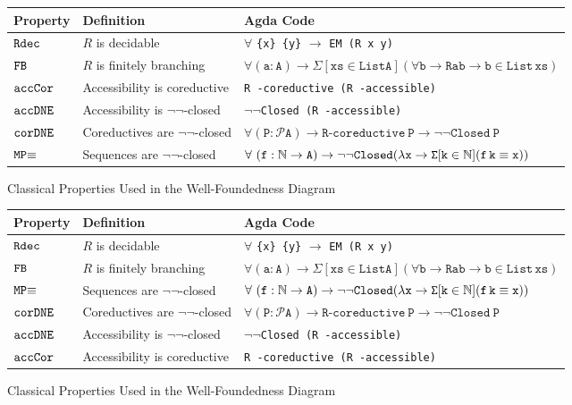 {
\def\arraystretch{1.3}
\begin{figure}[h!]
\small 
\begin{tabular}{@{}l l l @{}}
\toprule
\textbf{Property} & \textbf{Definition}  &\textbf{Agda Code}  \\
\midrule
$\mathtt{Rdec}$   & $R$ is decidable 
          & $\forall$ \verb|{x} {y}| $\to$ \verb|EM (R x y)|\\
$\mathtt{FB}$     & $R$ is finitely branching 
          & $\mathtt{\forall (a : A) \to \Sigma [ xs \in List A ] (\forall b \to R a b \to b \in{}List\, xs)}$ \\
$\mathtt{accCor}$ & Accessibility is coreductive 
          & \verb|R -coreductive (R -accessible)| \\
$\mathtt{accDNE}$ & Accessibility is $\lnot\lnot$-closed
          & $\lnot\lnot$\verb|Closed (R -accessible)| \\
$\mathtt{corDNE}$ & Coreductives are $\lnot\lnot$-closed 
          & $\mathtt{\forall (P : \mathcal{P} A) \to R}$-$\mathtt{coreductive\ P \to \lnot\lnot Closed\ P}$\\ 
$\mathtt{MP}{\equiv}$    & Sequences are $\lnot\lnot$-closed
          & $\forall\ \mathtt{(f : \nat \to A) \to \lnot\lnot Closed 
          (\lambda x \to \Sigma [ k \in \nat ] (f\, k \equiv x))}$ \\
\bottomrule
\end{tabular}
\centering
\caption{Classical Properties Used in the Well-Foundedness Diagram}
\label{tab:cprop}
\end{figure}
}

{
\def\arraystretch{1.3}
\begin{figure}[h!]
\small 
\begin{tabular}{@{}l l l @{}}
\toprule
\textbf{Property} & \textbf{Definition}  &\textbf{Agda Code}  \\
\midrule
$\mathtt{Rdec}$   & $R$ is decidable 
          & $\forall$ \verb|{x} {y}| $\to$ \verb|EM (R x y)|\\
$\mathtt{FB}$     & $R$ is finitely branching 
          & $\mathtt{\forall (a : A) \to \Sigma [ xs \in List A ] (\forall b \to R a b \to b \in{}List\, xs)}$ \\
$\mathtt{MP}{\equiv}$    & Sequences are $\lnot\lnot$-closed
          & $\forall\ \mathtt{(f : \nat \to A) \to \lnot\lnot Closed 
          (\lambda x \to \Sigma [ k \in \nat ] (f\, k \equiv x))}$ \\
$\mathtt{corDNE}$ & Coreductives are $\lnot\lnot$-closed 
          & $\mathtt{\forall (P : \mathcal{P} A) \to R}$-$\mathtt{coreductive\ P \to \lnot\lnot Closed\ P}$\\ 
$\mathtt{accDNE}$ & Accessibility is $\lnot\lnot$-closed
          & $\lnot\lnot$\verb|Closed (R -accessible)| \\
$\mathtt{accCor}$ & Accessibility is coreductive 
          & \verb|R -coreductive (R -accessible)| \\
\bottomrule
\end{tabular}
\centering
\caption{Classical Properties Used in the Well-Foundedness Diagram}
\label{tab:cprop}
\end{figure}
}


